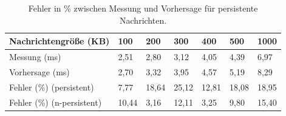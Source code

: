\begin{table}
\centering
  \begin{tabular}{| l | l | l | l |l | l | l |}
    \hline
    Nachrichtengröße (KB) & 100 & 200 & 300 & 400 & 500 & 1000 \\ \hline
    Messung (ms) & 2,51 & 2,80 & 3,12 & 4,05 & 4,39 & 6,97\\ \hline
    Vorhersage (ms) & 2,70 & 3,32 & 3,95 & 4,57 & 5,19 & 8,29\\ \hline
    Fehler (\%) (persistent) & 7,77 & 18,64 & 25,12 & 12,81 & 18,08 & 18,95\\ \hline
    Fehler (\%) (n-persistent) & 10,44 & 3,16 & 12,11 & 3,25 & 9,80 & 15,40\\ \hline
    
    \hline
      \end{tabular}
	\caption{\label{tab:sim5} Fehler in \% zwischen Messung und Vorhersage für persistente Nachrichten.}
\end{table}

